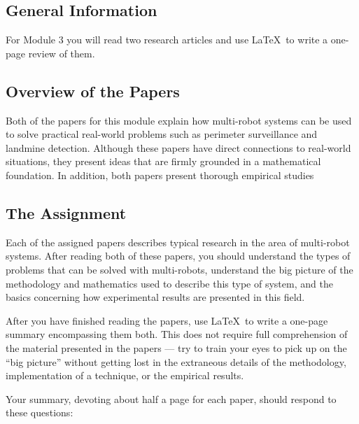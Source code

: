 
\usepackage[compact]{titlesec}




\subsection*{General Information}

For Module 3 you will read two research articles and use \LaTeX\ to write a one-page review of them.

\subsection*{Overview of the Papers}

Both of the papers for this module explain how multi-robot systems can be used to solve practical real-world problems
such as perimeter surveillance and landmine detection. Although these papers have direct connections to real-world
situations, they present ideas that are firmly grounded in a mathematical foundation. In addition, both papers present
thorough empirical studies 

\subsection*{The Assignment}

  Each of the assigned papers describes typical research in the area of multi-robot systems. After reading both of these
  papers, you should understand the types of problems that can be solved with multi-robots, understand the big picture
  of the methodology and mathematics used to describe this type of system, and the basics concerning how experimental
  results are presented in this field.

  After you have finished reading the papers, use \LaTeX\ to write a one-page summary encompassing them both.  This does
  not require full comprehension of the material presented in the papers --- try to train your eyes to pick up on the
  ``big picture'' without getting lost in the extraneous details of the methodology, implementation of a technique, or
  the empirical results.

  Your summary, devoting about half a page for each paper, should respond to these questions:

